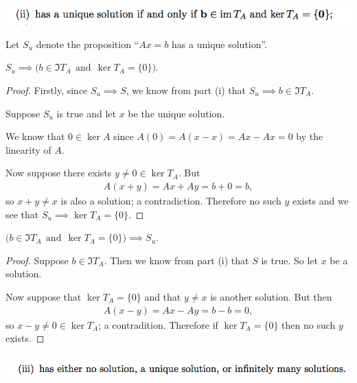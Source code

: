 \documentclass[12pt]{article}
\begin{document}
\subsubsection*{} %
\begin{mdframed}
\includegraphics[width=400pt]{img/oxford-prelims-2017-A-2-1-2.png}
\end{mdframed}

Let $S_u$ denote the proposition ``$Ax = b$ has a unique solution''.

\begin{claim*}
  $S_u \implies \Big(b \in \Im T_A ~~\text{and}~~ \ker T_A = \{0\}\Big)$.
\end{claim*}

\begin{proof}
Firstly, since $S_u \implies S$, we know from part (i) that
$S_u \implies b \in \Im T_A$.

Suppose $S_u$ is true and let $x$ be the unique solution.

We know that $0 \in \ker A$ since $A(0) = A(x - x) = Ax - Ax = 0$ by the
linearity of $A$.

Now suppose there exists $y \neq 0 \in \ker T_A$. But
\begin{align*}
A(x + y) = Ax + Ay = b + 0 = b,
\end{align*}
so $x + y \neq x$ is also a solution; a contradiction. Therefore no such $y$
exists and we see that $S_u \implies \ker T_A = \{0\}$.
\end{proof}

\begin{claim*}
  $\Big(b \in \Im T_A ~~\text{and}~~ \ker T_A = \{0\}\Big) \implies S_u$.
\end{claim*}

\begin{proof}
  Suppose $b \in \Im T_A$. Then we know from part (i) that $S$ is true. So let
  $x$ be a solution.

Now suppose that $\ker T_A = \{0\}$ and that $y \neq x$ is another solution. But then
\begin{align*}
  A(x - y) = Ax - Ay = b - b = 0,
\end{align*}
so $x - y \neq 0 \in \ker T_A$; a contradition. Therefore if $\ker T_A = \{0\}$
then no such $y$ exists.
\end{proof}

\subsubsection*{} %
\begin{mdframed}
\includegraphics[width=400pt]{img/oxford-prelims-2017-A-2-1-3.png}
\end{mdframed}
\end{document}
